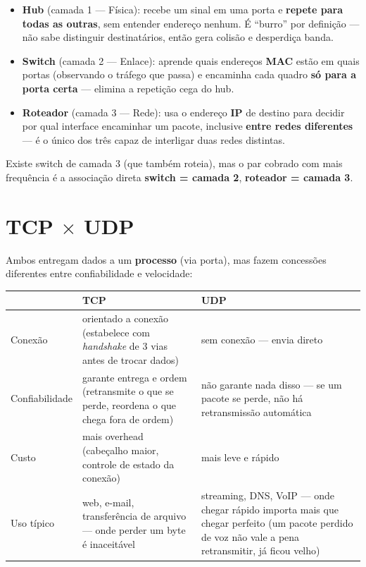 \begin{conceito}
\begin{itemize}
\item \textbf{Hub} (camada 1 --- Física): recebe um sinal em uma porta e
\textbf{repete para todas as outras}, sem entender endereço nenhum. É “burro”
por definição --- não sabe distinguir destinatários, então gera colisão e
desperdiça banda.
\item \textbf{Switch} (camada 2 --- Enlace): aprende quais endereços
\textbf{MAC} estão em quais portas (observando o tráfego que passa) e
encaminha cada quadro \textbf{só para a porta certa} --- elimina a
repetição cega do hub.
\item \textbf{Roteador} (camada 3 --- Rede): usa o endereço \textbf{IP} de
destino para decidir por qual interface encaminhar um pacote, inclusive
\textbf{entre redes diferentes} --- é o único dos três capaz de interligar
duas redes distintas.
\end{itemize}
Existe switch de camada 3 (que também roteia), mas o par cobrado com mais
frequência é a associação direta \textbf{switch = camada 2}, \textbf{roteador
= camada 3}.
\end{conceito}

\section{TCP $\times$ UDP}

\begin{conceito}
Ambos entregam dados a um \textbf{processo} (via porta), mas fazem
concessões diferentes entre confiabilidade e velocidade:

\begin{center}
\begin{tabular}{@{}p{2.6cm}p{4.6cm}p{4.6cm}@{}}
\toprule
& \textbf{TCP} & \textbf{UDP} \\
\midrule
Conexão & orientado a conexão (estabelece com \textit{handshake} de 3 vias
antes de trocar dados) & sem conexão --- envia direto \\
Confiabilidade & garante entrega e ordem (retransmite o que se perde,
reordena o que chega fora de ordem) & não garante nada disso --- se um
pacote se perde, não há retransmissão automática \\
Custo & mais overhead (cabeçalho maior, controle de estado da conexão) &
mais leve e rápido \\
Uso típico & web, e-mail, transferência de arquivo --- onde perder um byte
é inaceitável & streaming, DNS, VoIP --- onde chegar rápido importa mais
que chegar perfeito (um pacote perdido de voz não vale a pena retransmitir,
já ficou velho) \\
\bottomrule
\end{tabular}
\end{center}
\end{conceito}


